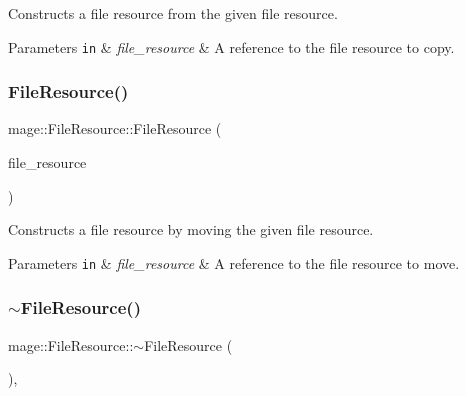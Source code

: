 Constructs a file resource from the given file resource.


\begin{DoxyParams}[1]{Parameters}
\mbox{\tt in}  & {\em file\+\_\+resource} & A reference to the file resource to copy. \\
\hline
\end{DoxyParams}
\hypertarget{classmage_1_1_file_resource_a8022b27741face9debe1e8ccb1bc54e3}{}\label{classmage_1_1_file_resource_a8022b27741face9debe1e8ccb1bc54e3} 
\subsubsection{\texorpdfstring{File\+Resource()}{FileResource()}\hspace{0.1cm}{\footnotesize\ttfamily [3/3]}}
{\footnotesize\ttfamily mage\+::\+File\+Resource\+::\+File\+Resource (\begin{DoxyParamCaption}\item[{\hyperlink{classmage_1_1_file_resource}{File\+Resource} \&\&}]{file\+\_\+resource }\end{DoxyParamCaption})\hspace{0.3cm}{\ttfamily [default]}}

Constructs a file resource by moving the given file resource.


\begin{DoxyParams}[1]{Parameters}
\mbox{\tt in}  & {\em file\+\_\+resource} & A reference to the file resource to move. \\
\hline
\end{DoxyParams}
\hypertarget{classmage_1_1_file_resource_a864fc0373785b1d5a82fecdc3aee7e46}{}\label{classmage_1_1_file_resource_a864fc0373785b1d5a82fecdc3aee7e46} 
\subsubsection{\texorpdfstring{$\sim$\+File\+Resource()}{~FileResource()}}
{\footnotesize\ttfamily mage\+::\+File\+Resource\+::$\sim$\+File\+Resource (\begin{DoxyParamCaption}{ }\end{DoxyParamCaption})\hspace{0.3cm}{\ttfamily [virtual]}, {\ttfamily [default]}}

